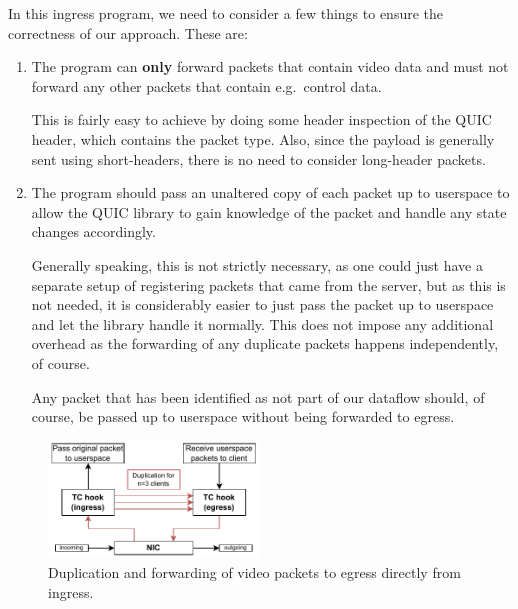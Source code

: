 In this ingress program, we need to consider a few things to ensure the correctness
of our approach.
These are:
\begin{enumerate}
    \item   The program can \textbf{only} forward packets that contain video data and must not 
            forward any other packets that contain e.g.~control data.

            This is fairly easy to achieve by doing some header inspection of the QUIC header,
                which contains the packet type. Also, since the payload is generally sent using 
                short-headers, there is no need to consider long-header packets.

    \item   The program should pass an unaltered copy of each packet up to userspace to allow the 
            QUIC library to gain knowledge of the packet and handle any state changes accordingly.

            Generally speaking, this is not strictly necessary, as one could just have a separate 
                setup of registering packets that came from the server, but as this is not needed,
                it is considerably easier to just pass the packet up to userspace and let the 
                library handle it normally. This does not impose any additional overhead as the
                forwarding of any duplicate packets happens independently, of course.

            Any packet that has been identified as not part of our dataflow should, of course, 
                be passed up to userspace without being forwarded to egress.
\end{enumerate}

\begin{figure}[htbp]
    \centering
    \includegraphics[width=0.5\textwidth]{figures/03_fast_relays/packet-forwarding.drawio.pdf}
    \caption[Video packet duplication]{Duplication and forwarding of video packets to egress directly 
    from ingress.}\label{fig:packet-forwarding-duplication}
\end{figure}


